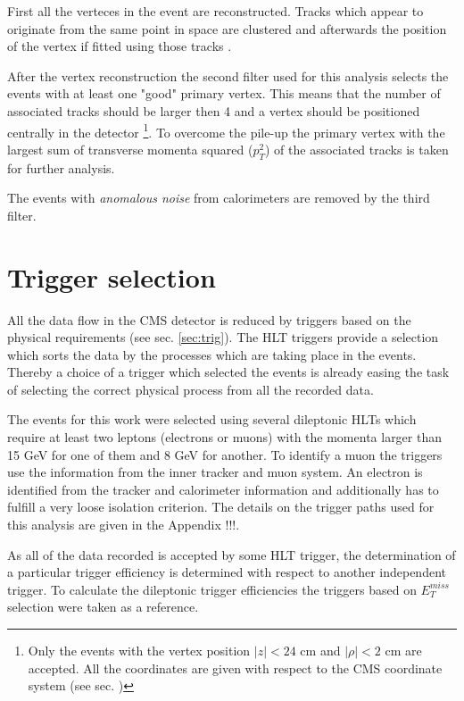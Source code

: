 First all the verteces in the event are reconstructed.
Tracks which appear to originate from the same point in space are clustered and afterwards the position of the vertex if fitted using those tracks \cite{TrackPerf}.

After the vertex reconstruction the second filter used for this analysis selects the events with at least one "good" primary vertex.
This means that the number of associated tracks should be larger then 4 and a vertex should be positioned centrally in the detector
\footnote{Only the events with the vertex position $|z| < \textrm{24 cm}$ and $|\rho| < \textrm{2 cm}$ are accepted. All the coordinates
are given with respect to the CMS coordinate system (see sec.\label{sec:CMS} )}. To overcome the pile-up the primary vertex with the 
largest sum of transverse momenta squared ($p_{T}^{2}$) of the associated tracks is taken for further analysis.

The events with \textit{anomalous noise} from calorimeters are removed by the third filter.


\section{Trigger selection}

All the data flow in the CMS detector is reduced by triggers based on the physical requirements (see sec. \ref{sec:trig}).
The HLT triggers provide a selection which sorts the data by the processes which are taking place in the events. Thereby
a choice of a trigger which selected the events is already easing the task of selecting the correct physical process from
all the recorded data.

The events for this work were selected using several dileptonic HLTs which require at least two leptons (electrons or muons)
with the momenta larger than 15 GeV for one of them and 8 GeV for another. To identify a muon the triggers use the information
from the inner tracker and muon system. An electron is identified from the tracker and calorimeter information and additionally
has to fulfill a very loose isolation criterion. The details on the trigger paths used for this analysis are given in the
Appendix !!!.

As all of the data recorded is accepted by some HLT trigger, the determination of a particular trigger efficiency is determined with 
respect to another independent trigger. To calculate the dileptonic trigger efficiencies the triggers based on $E_{T}^{miss}$ selection
were taken as a reference.



